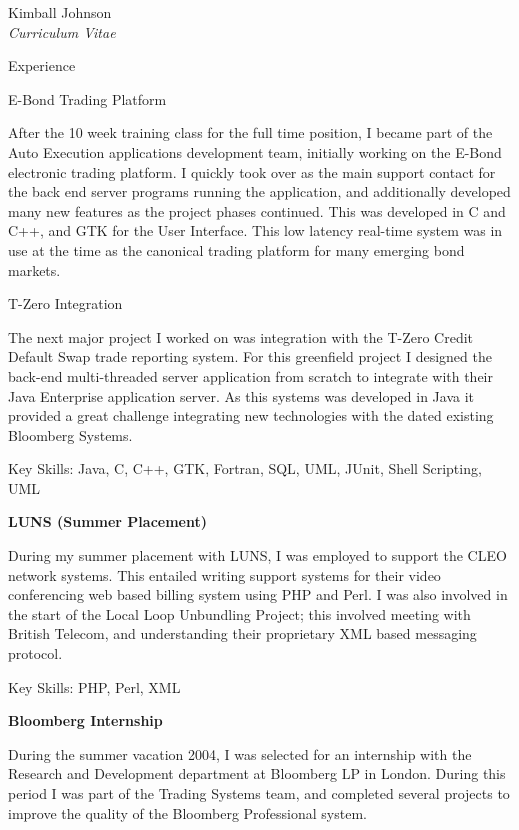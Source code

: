 \documentclass[10pt]{article}
\newenvironment{subbulletlist}{%
	\begin{list}{\labelitemii}{%
		\setlength{\topsep}{\itemsep}\setlength{\parskip}{\parsep}%
	}%
}%
{ \end{list} }
\begin{document}
\begin{cv}{Kimball Johnson\\{\large \itshape Curriculum Vitae}}
\begin{cvlist}{Experience}
	\begin{subbulletlist}
    \item E-Bond Trading Platform

    After the 10 week training class for the full time position, I became part of 
    the Auto Execution applications development team, initially working on the 
    E-Bond electronic trading platform. I quickly took over as the main support 
    contact for the back end server programs running the application, and 
    additionally developed many new features as the project phases continued.
    This was developed in C and C++, and GTK for the User Interface.  This low latency 
	real-time system was in use at the time as the canonical trading platform for 
	many emerging bond markets.
    
    \item T-Zero Integration

    The next major project I worked on was integration with the T-Zero
    Credit Default Swap trade reporting system. For this greenfield project 
	I designed the back-end multi-threaded server application from scratch to integrate 
	with their Java Enterprise application server.  As this systems was developed
	in Java it provided a great challenge integrating new technologies with the dated 
    existing Bloomberg Systems.  
	\end{subbulletlist}

	Key Skills: Java, C, C++, GTK, Fortran, SQL, UML, JUnit, Shell Scripting, UML 
	\item \textbf{LUNS (Summer Placement)}

    During my summer placement with LUNS, I was employed to support
    the CLEO network systems. This entailed writing support systems for 
    their video conferencing web based billing system using PHP and Perl. 
    I was also involved in the start of the Local Loop Unbundling Project; 
    this involved meeting with British Telecom, and
    understanding their proprietary XML based messaging protocol.

	Key Skills: PHP, Perl, XML
    \item \textbf{Bloomberg Internship}

    During the summer vacation 2004, I was selected for an internship with the 
    Research and Development department at Bloomberg LP in London. During this 
    period I was part of the Trading Systems team, and completed several projects
    to improve the quality of the Bloomberg Professional system.


\end{cvlist}
\end{cv}
\end{document}
